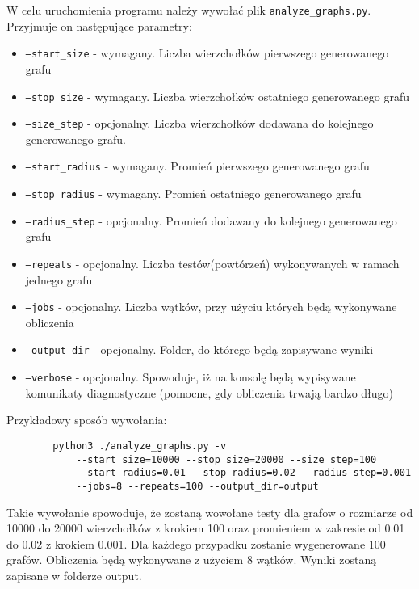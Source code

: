 		\noindent W celu uruchomienia programu należy wywołać plik \texttt{analyze\_graphs.py}. Przyjmuje on następujące parametry:
		\begin{itemize}
			\item \texttt{---start\_size} - wymagany. Liczba wierzchołków pierwszego generowanego grafu

			\item \texttt{---stop\_size} - wymagany. Liczba wierzchołków ostatniego generowanego grafu

			\item \texttt{---size\_step} - opcjonalny. Liczba wierzchołków dodawana do kolejnego generowanego grafu.

			\item \texttt{---start\_radius} - wymagany. Promień pierwszego generowanego grafu

			\item \texttt{---stop\_radius} - wymagany. Promień ostatniego generowanego grafu

			\item \texttt{---radius\_step} - opcjonalny. Promień dodawany do kolejnego generowanego grafu

			\item \texttt{---repeats} - opcjonalny. Liczba testów(powtórzeń) wykonywanych w ramach jednego grafu

			\item \texttt{---jobs} - opcjonalny. Liczba wątków, przy użyciu których będą wykonywane obliczenia

			\item \texttt{---output\_dir} - opcjonalny. Folder, do którego będą zapisywane wyniki

			\item \texttt{---verbose} - opcjonalny. Spowoduje, iż na konsolę będą wypisywane komunikaty diagnostyczne (pomocne, gdy obliczenia trwają bardzo długo)
		\end{itemize}

		Przykładowy sposób wywołania:

		\begin{verbatim}
		python3 ./analyze_graphs.py -v
		    --start_size=10000 --stop_size=20000 --size_step=100
		    --start_radius=0.01 --stop_radius=0.02 --radius_step=0.001
		    --jobs=8 --repeats=100 --output_dir=output
		\end{verbatim}

		Takie wywołanie spowoduje, że zostaną wowołane testy dla grafow o rozmiarze od 10000 do 20000 wierzchołków z krokiem 100 oraz promieniem w zakresie od 0.01 do 0.02 z krokiem 0.001. Dla każdego przypadku zostanie wygenerowane 100 grafów. Obliczenia będą wykonywane z użyciem 8 wątków. Wyniki zostaną zapisane w folderze output.
